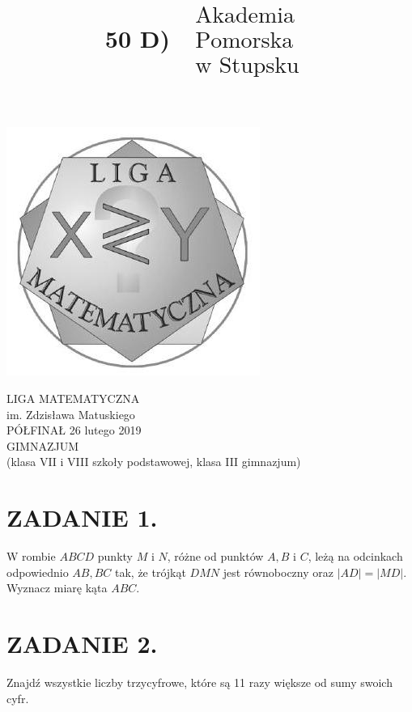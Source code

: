 \documentclass[10pt]{article}
\title{50 D) \(\begin{gathered}\text { Akademia } \\ \text { Pomorska } \\ \text { w Stupsku }\end{gathered}\) }
\author{}
\date{}
\begin{document}
\maketitle
\begin{center}
\includegraphics[max width=\textwidth]{2024_11_21_943a59a868dc10504530g-1}
\end{center}

LIGA MATEMATYCZNA\\
im. Zdzisława Matuskiego\\
PÓŁFINAŁ 26 lutego 2019\\
GIMNAZJUM\\
(klasa VII i VIII szkoły podstawowej, klasa III gimnazjum)

\section*{ZADANIE 1.}
W rombie \(A B C D\) punkty \(M\) i \(N\), różne od punktów \(A, B\) i \(C\), leżą na odcinkach odpowiednio \(A B, B C\) tak, że trójkąt \(D M N\) jest równoboczny oraz \(|A D|=|M D|\). Wyznacz miarę kąta \(A B C\).

\section*{ZADANIE 2.}
Znajdź wszystkie liczby trzycyfrowe, które są 11 razy większe od sumy swoich cyfr.
\end{document}
